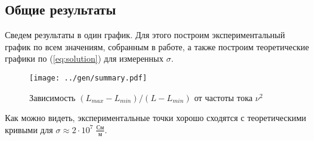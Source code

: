 \subsection*{Общие результаты}

Сведем результаты в один график. Для этого построим экспериментальный график по всем значениям, собранным в работе, а также построим теоретические графики по (\ref{eq:solution}) для измеренных $\sigma$.

\begin{figure}[H]
	\centering
	\texttt{[image: ../gen/summary.pdf]}
	\caption{Зависимость $(L_{max} - L_{min})/(L - L_{min})$ от частоты тока $\nu^2$}
	\label{fig:summary}
\end{figure}

Как можно видеть, экспериментальные точки хорошо сходятся с теоретическими кривыми для $\sigma \approx 2 \cdot 10^7  \; \frac{\text{См}}{\text{м}}$.